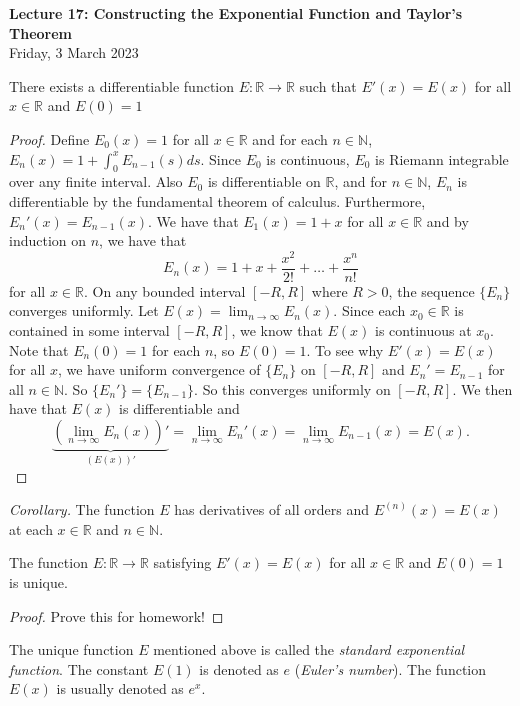 \documentclass[11pt]{article}
\theoremstyle{definition}
\newcommand{\R}{\mathbb{R}}                      %
\newcommand{\N}{\mathbb{N}}
\begin{document}
\thispagestyle{empty}

\begin{center}
{\LARGE \bf Lecture 17: Constructing the Exponential Function and Taylor's Theorem}\\
{\large Friday, 3 March 2023}\\
\end{center}


\prop There exists a differentiable function $E:\R\to\R$ such that $E'(x)=E(x)$ for all $x\in\R$ and $E(0)=1$

\begin{proof}
    Define $E_0(x)=1$ for all $x\in\R$ and for each $n\in\N$, $E_n(x)=1+\int_0^x E_{n-1}(s)ds$. Since $E_0$ is continuous, $E_0$ is Riemann integrable over any finite interval. Also $E_0$ is differentiable on $\R$, and for $n\in \N$, $E_n$ is differentiable by the fundamental theorem of calculus. Furthermore, $E_n'(x)=E_{n-1}(x)$. We have that $E_1(x)=1+x$ for all $x\in \R$ and by induction on $n$, we have that 
    $$
    E_n(x)=1+x+\frac{x^2}{2!}+\dots+\frac{x^n}{n!}
    $$
    for all $x\in \R$. On any bounded interval $[-R,R]$ where $R>0$, the sequence $\{E_n\}$ converges uniformly. Let $E(x)=\lim_{n\to\infty}E_n(x)$. Since each $x_0\in\R$ is contained in some interval $[-R,R]$, we know that $E(x)$ is continuous at $x_0$. Note that $E_n(0)=1$ for each $n$, so $E(0)=1$. To see why $E'(x)=E(x)$ for all $x$, we have uniform convergence of $\{E_n\}$ on $[-R,R]$ and $E_n'=E_{n-1}$ for all $n\in \N$. So $\{E_n'\}=\{E_{n-1}\}$. So this converges uniformly on $[-R,R]$. We then have that $E(x)$ is differentiable and 
    $$
    \underbrace{\left(\lim_{n\to\infty} E_n(x)\right)'}_{(E(x))'}=\lim_{n\to\infty} E_n'(x)=\lim_{n\to\infty} E_{n-1}(x)=E(x).
    $$
\end{proof}

\textit{Corollary.} The function $E$ has derivatives of all orders and $E^{(n)}(x)=E(x)$ at each $x\in\R$ and $n\in\N$.

\prop The function $E:\R\to\R$ satisfying $E'(x)=E(x)$ for all $x\in\R$ and $E(0)=1$ is unique.

\begin{proof}
    Prove this for homework!
\end{proof}
\begin{mdframed}[backgroundcolor = blue!10]
\vspace{+0.2cm}
 The unique function $E$ mentioned above is called the \textit{standard exponential function}. The constant $E(1)$ is denoted as $e$ (\textit{Euler's number}). The function $E(x)$ is usually denoted as $e^x$.
\end{mdframed}
\end{document}
